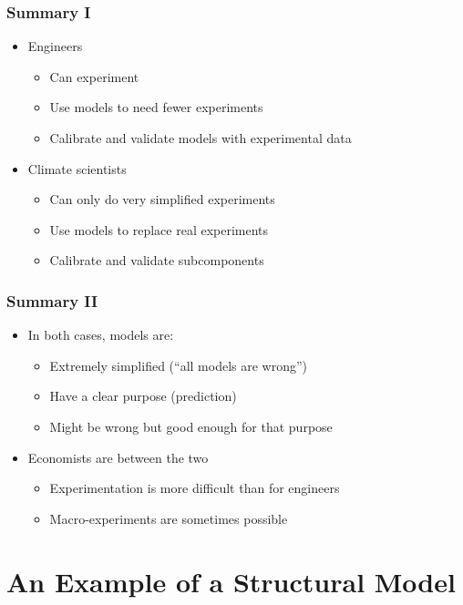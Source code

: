 \documentclass[11pt]{beamer}
\begin{document}
\begin{frame}[c]\frametitle{Summary I}
    \begin{itemize}
        \item Engineers
        \begin{itemize}
            \item Can experiment
            \item Use models to need fewer experiments
            \item Calibrate and validate models with experimental data
        \end{itemize}
        \item Climate scientists
        \begin{itemize}
            \item Can only do very simplified experiments
            \item Use models to replace real experiments
            \item Calibrate and validate subcomponents
        \end{itemize}
    \end{itemize}
\end{frame}



\begin{frame}[c]\frametitle{Summary II}
\begin{itemize}
    \item In both cases, models are:
    \begin{itemize}
         \item Extremely simplified (``all models are wrong'')
         \item Have a clear purpose (prediction)
         \item Might be wrong but good enough for that purpose
     \end{itemize}
     \item Economists are between the two
     \begin{itemize}
         \item Experimentation is more difficult than for engineers
         \item Macro-experiments are sometimes possible
     \end{itemize}
\end{itemize}
\end{frame}


\section{An Example of a Structural Model}
\end{document}
